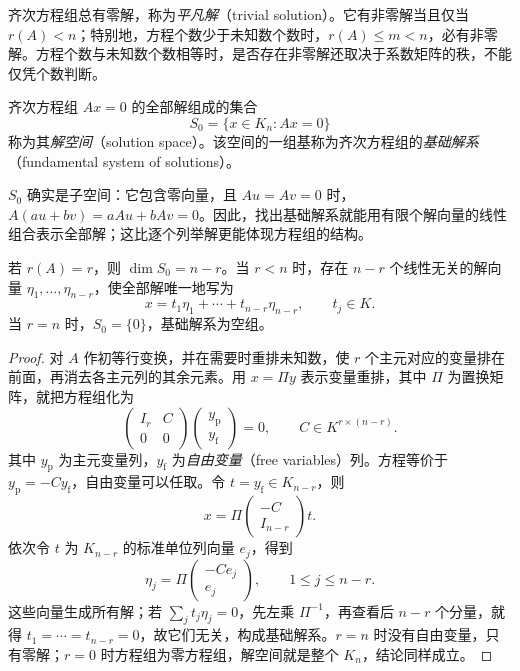 齐次方程组总有零解，称为\emph{平凡解}（trivial solution）。它有非零解当且仅当 $r(A)<n$；特别地，方程个数少于未知数个数时，$r(A)\leq m<n$，必有非零解。方程个数与未知数个数相等时，是否存在非零解还取决于系数矩阵的秩，不能仅凭个数判断。

\begin{definition}
\label{def:homogeneous-solution-space}
齐次方程组 $Ax=0$ 的全部解组成的集合
\[
    S_0=\{x\in K_n:Ax=0\}
\]
称为其\emph{解空间}（solution space）。该空间的一组基称为齐次方程组的\emph{基础解系}（fundamental system of solutions）。
\end{definition}

$S_0$ 确实是子空间：它包含零向量，且 $Au=Av=0$ 时，$A(au+bv)=aAu+bAv=0$。因此，找出基础解系就能用有限个解向量的线性组合表示全部解；这比逐个列举解更能体现方程组的结构。

\begin{theorem}
\label{thm:homogeneous-solution-dimension}
若 $r(A)=r$，则 $\dim S_0=n-r$。当 $r<n$ 时，存在 $n-r$ 个线性无关的解向量 $\eta_1,\ldots,\eta_{n-r}$，使全部解唯一地写为
\begin{equation}
\label{eq:homogeneous-general-solution}
    x=t_1\eta_1+\cdots+t_{n-r}\eta_{n-r},\qquad t_j\in K.
\end{equation}
当 $r=n$ 时，$S_0=\{0\}$，基础解系为空组。
\end{theorem}

\begin{proof}
对 $A$ 作初等行变换，并在需要时重排未知数，使 $r$ 个主元对应的变量排在前面，再消去各主元列的其余元素。用 $x=\Pi y$ 表示变量重排，其中 $\Pi$ 为置换矩阵，就把方程组化为
\[
    \begin{pmatrix}I_r&C\\0&0\end{pmatrix}
    \begin{pmatrix}y_{\mathrm p}\\y_{\mathrm f}\end{pmatrix}=0,
    \qquad C\in K^{r\times(n-r)}.
\]
其中 $y_{\mathrm p}$ 为主元变量列，$y_{\mathrm f}$ 为\emph{自由变量}（free variables）列。方程等价于 $y_{\mathrm p}=-Cy_{\mathrm f}$，自由变量可以任取。令 $t=y_{\mathrm f}\in K_{n-r}$，则
\[
    x=\Pi\begin{pmatrix}-C\\I_{n-r}\end{pmatrix}t.
\]
依次令 $t$ 为 $K_{n-r}$ 的标准单位列向量 $e_j$，得到
\begin{equation}
\label{eq:fundamental-solutions-from-free-variables}
    \eta_j=\Pi\begin{pmatrix}-Ce_j\\e_j\end{pmatrix},
    \qquad 1\leq j\leq n-r.
\end{equation}
这些向量生成所有解；若 $\sum_jt_j\eta_j=0$，先左乘 $\Pi^{-1}$，再查看后 $n-r$ 个分量，就得 $t_1=\cdots=t_{n-r}=0$，故它们无关，构成基础解系。$r=n$ 时没有自由变量，只有零解；$r=0$ 时方程组为零方程组，解空间就是整个 $K_n$，结论同样成立。
\end{proof}

